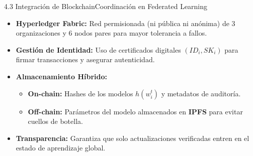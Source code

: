 \begin{frame}{4.3 Integración de Blockchain}{Coordinación en Federated Learning}
    \begin{itemize}
        \item \textbf{Hyperledger Fabric:} Red permisionada (ni pública ni anónima) de 3 organizaciones y 6 nodos pares para mayor tolerancia a fallos.
        \item \textbf{Gestión de Identidad:} Uso de certificados digitales $(ID_i, SK_i)$ para firmar transacciones y asegurar autenticidad.
        \item \textbf{Almacenamiento Híbrido:}
        \begin{itemize}
            \item \textbf{On-chain:} Hashes de los modelos $h(w_i^t)$ y metadatos de auditoría.
            \item \textbf{Off-chain:} Parámetros del modelo almacenados en \textbf{IPFS} para evitar cuellos de botella.
        \end{itemize}
        \item \textbf{Transparencia:} Garantiza que solo actualizaciones verificadas entren en el estado de aprendizaje global.
    \end{itemize}
\end{frame}